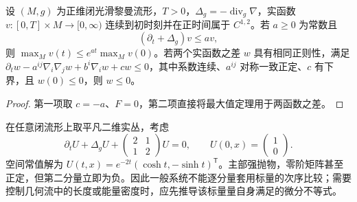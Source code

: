 \begin{corollary}\label{g3:cor:parabolic-gronwall}
	设 \((M,g)\) 为正维闭光滑黎曼流形，\(T>0\)，\(\Delta_g=-\operatorname{div}_g\nabla\)，实函数 \(v:[0,T]\times M\to[0,\infty)\) 连续到初时刻并在正时间属于 \(C^{1,2}\)。若 \(a\ge0\) 为常数且
	\[
		(\partial_t+\Delta_g)v\le av,
	\]
	则 \(\max_Mv(t)\le e^{at}\max_Mv(0)\)。若两个实函数之差 \(w\) 具有相同正则性，满足 \(\partial_tw-a^{ij}\nabla_i\nabla_jw+b^i\nabla_iw+cw\le0\)，其中系数连续、\(a^{ij}\) 对称一致正定、\(c\) 有下界，且 \(w(0)\le0\)，则 \(w\le0\)。
\end{corollary}
\begin{proof}
	第一项取 \(c=-a\)、\(F=0\)，第二项直接将最大值定理用于两函数之差。
\end{proof}

\begin{example}\label{g3:exm:parabolic-system-order-failure}
	在任意闭流形上取平凡二维实丛，考虑
	\[
		\partial_tU+\Delta_gU+
		\begin{pmatrix}2&1\\1&2\end{pmatrix}U=0,
		\qquad U(0,x)=\begin{pmatrix}1\\0\end{pmatrix}.
	\]
	空间常值解为 \(U(t,x)=e^{-2t}(\cosh t,-\sinh t)^{\mathsf T}\)。主部强抛物，零阶矩阵甚至正定，但第二分量立即为负。因此一般系统不能逐分量套用标量的次序比较；需要控制几何流中的长度或能量密度时，应先推导该标量量自身满足的微分不等式。
\end{example}
